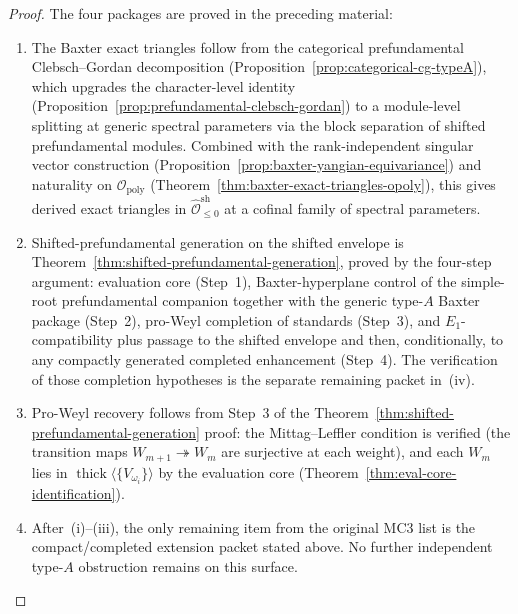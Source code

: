 \begin{proof}
The four packages are proved in the preceding material:
\begin{enumerate}[label=(\roman*),nosep]
\item The Baxter exact triangles follow from the categorical
 prefundamental Clebsch--Gordan decomposition
 (Proposition~\ref{prop:categorical-cg-typeA}), which upgrades the
 character-level identity
 (Proposition~\ref{prop:prefundamental-clebsch-gordan}) to a
 module-level splitting at generic spectral parameters via the
 block separation of shifted prefundamental modules. Combined
 with the rank-independent singular vector construction
 (Proposition~\ref{prop:baxter-yangian-equivariance}) and naturality
 on $\mathcal{O}_{\mathrm{poly}}$
 (Theorem~\ref{thm:baxter-exact-triangles-opoly}), this gives
 derived exact triangles in
 $\widehat{\mathcal{O}}^{\mathrm{sh}}_{\leq 0}$ at a cofinal
 family of spectral parameters.
\item Shifted-prefundamental generation on the shifted envelope is
 Theorem~\ref{thm:shifted-prefundamental-generation}, proved by the
 four-step argument: evaluation core (Step~1), Baxter-hyperplane
 control of the simple-root prefundamental companion together with
 the generic type-$A$ Baxter package (Step~2), pro-Weyl completion of
 standards (Step~3), and $E_1$-compatibility plus passage to the
 shifted envelope and then, conditionally, to any compactly generated
 completed enhancement (Step~4). The verification of those completion
 hypotheses is the separate remaining packet in~(iv).
\item Pro-Weyl recovery follows from Step~3 of the
 Theorem~\ref{thm:shifted-prefundamental-generation} proof:
 the Mittag--Leffler condition is verified (the transition maps
 $W_{m+1} \twoheadrightarrow W_m$ are surjective at each weight),
 and each $W_m$ lies in
 $\operatorname{thick}\langle\{V_{\omega_i}\}\rangle$ by the
 evaluation core (Theorem~\ref{thm:eval-core-identification}).
\item After~(i)--(iii), the only remaining item from the original MC3
 list is the compact/completed extension packet stated above.
 No further independent type-$A$ obstruction remains on this
 surface.
\end{enumerate}
\end{proof}

